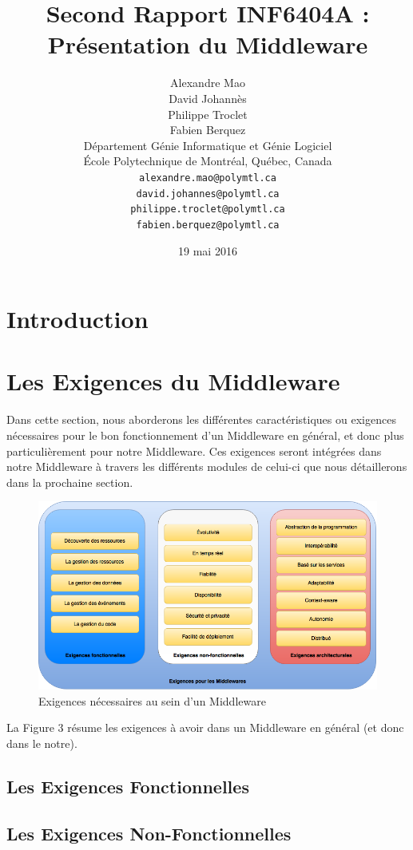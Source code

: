 \documentclass{article}
\title{Second Rapport INF6404A : Présentation du Middleware}
\author{
	Alexandre Mao\\
	David Johannès \\
	Philippe Troclet \\
	Fabien Berquez \\
	D\'{e}partement G\'{e}nie Informatique et G\'{e}nie Logiciel \\
	\'{E}cole Polytechnique de Montr\'{e}al, Qu\'{e}bec, Canada \\
	\texttt{alexandre.mao@polymtl.ca}\\
	\texttt{david.johannes@polymtl.ca}\\
	\texttt{philippe.troclet@polymtl.ca}   \\
	\texttt{fabien.berquez@polymtl.ca}   \\
}
\date{19 mai 2016}
\begin{document}
\maketitle

\section{Introduction}


\section{Les Exigences du Middleware}
Dans cette section, nous aborderons les différentes caractéristiques ou exigences nécessaires pour le bon fonctionnement d'un Middleware en général, et donc plus particulièrement pour notre Middleware. Ces exigences seront intégrées dans notre Middleware à travers les différents modules de celui-ci que nous détaillerons dans la prochaine section.

\begin{figure}[h!]
	\hspace*{-3cm}
	\centering
	\includegraphics[width=1.5\textwidth]{Figure3.png}
	\caption{Exigences nécessaires au sein d'un Middleware}
	\label{fig:balance}
\end{figure}

La Figure 3 résume les exigences à avoir dans un Middleware en général (et donc dans le notre).

\subsection{Les Exigences Fonctionnelles}

\subsection{Les Exigences Non-Fonctionnelles}

\end{document}
